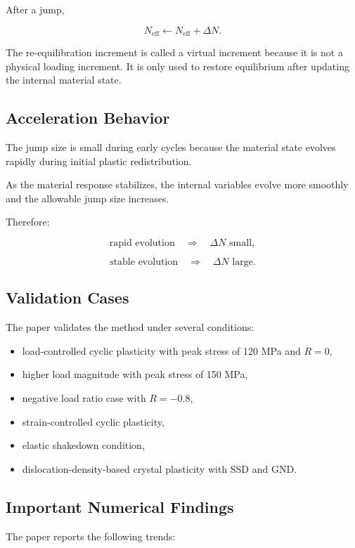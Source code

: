 ﻿\documentclass[11pt,a4paper]{article}
\begin{document}
After a jump,

\[
N_{\mathrm{eff}}
\leftarrow
N_{\mathrm{eff}}+\Delta N.
\]

The re-equilibration increment is called a virtual increment because it is not a physical loading increment. It is only used to restore equilibrium after updating the internal material state.

\subsection{Acceleration Behavior}

The jump size is small during early cycles because the material state evolves rapidly during initial plastic redistribution.

As the material response stabilizes, the internal variables evolve more smoothly and the allowable jump size increases.

Therefore:

\[
\text{rapid evolution}
\quad
\Rightarrow
\quad
\Delta N \text{ small},
\]

\[
\text{stable evolution}
\quad
\Rightarrow
\quad
\Delta N \text{ large}.
\]

\subsection{Validation Cases}

The paper validates the method under several conditions:

\begin{itemize}[leftmargin=*]
    \item load-controlled cyclic plasticity with peak stress of 120 MPa and $R=0$,
    \item higher load magnitude with peak stress of 150 MPa,
    \item negative load ratio case with $R=-0.8$,
    \item strain-controlled cyclic plasticity,
    \item elastic shakedown condition,
    \item dislocation-density-based crystal plasticity with SSD and GND.
\end{itemize}

\subsection{Important Numerical Findings}

The paper reports the following trends:
\end{document}

